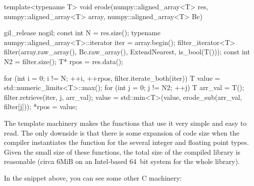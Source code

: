 \documentclass{scrartcl}
\newcommand*{\cpp}{{C\nolinebreak[4]\hspace{-.05em}\raisebox{.4ex}{\tiny\textbf{++}}}}
\begin{document}
\begin{cplusplus}
template<typename T>
void erode(numpy::aligned_array<T> res,
            numpy::aligned_array<T> array,
            numpy::aligned_array<T> Bc) {
    gil_release nogil;
    const int N = res.size();
    typename numpy::aligned_array<T>::iterator iter = array.begin();
    filter_iterator<T> filter(array.raw_array(), Bc.raw_array(),
                    ExtendNearest, is_bool(T()));
    const int N2 = filter.size();
    T* rpos = res.data();

    for (int i = 0;
            i != N;
                ++i, ++rpos, filter.iterate_both(iter)) {
        T value = std::numeric_limits<T>::max();
        for (int j = 0; j != N2; ++j) {
            T arr_val = T();
            filter.retrieve(iter, j, arr_val);
            value = std::min<T>(value, erode_sub(arr_val, filter[j]));
        }
        *rpos = value;
    }
}
\end{cplusplus}

The template machinery makes the functions that use it very simple and easy to
read. The only downside is that there is some expansion of code size when the
compiler instantiates the function for the several integer and floating point
types. Given the small size of these functions, the total size of the compiled
library is reasonable (circa 6MiB on an Intel-based 64~bit system for the whole
library).

In the snippet above, you can see some other \cpp{} machinery:
\end{document}
